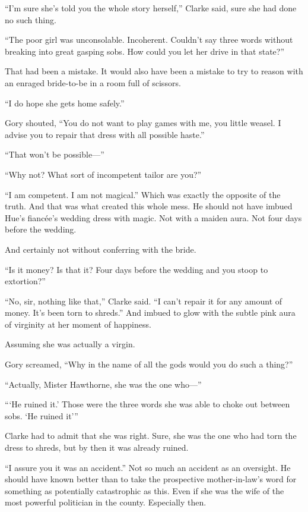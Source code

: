 ``I'm sure she's told you the whole story herself,'' Clarke said, sure she
had done no such thing.

``The poor girl was unconsolable. Incoherent. Couldn't say three words
without breaking into great gasping sobs. How could you let her drive in
that state?''

That had been a mistake. It would also have been a mistake to try to
reason with an enraged bride-to-be in a room full of scissors.

``I do hope she gets home safely.''

Gory shouted, ``You do not want to play games with me, you little weasel.
I advise you to repair that dress with all possible haste.''

``That won't be possible---''

``Why not? What sort of incompetent tailor are you?''

``I am competent. I am not magical.'' Which was exactly the opposite of
the truth. And that was what created this whole mess. He should not have
imbued Hue's fiancée's wedding dress with magic. Not with a maiden aura.
Not four days before the wedding.

And certainly not without conferring with the bride.

``Is it money? Is that it? Four days before the wedding and you stoop to
extortion?''

``No, sir, nothing like that,'' Clarke said. ``I can't repair it for any
amount of money. It's been torn to shreds.'' And imbued to glow with the
subtle pink aura of virginity at her moment of happiness.

Assuming she was actually a virgin.

Gory screamed, ``Why in the name of all the gods would you do such a
thing?''

``Actually, Mister Hawthorne, she was the one who---''

``\thinspace `He ruined it.' Those were the three words she was able to choke out
between sobs. `He ruined it'\thinspace ''

Clarke had to admit that she was right. Sure, she was the one who had
torn the dress to shreds, but by then it was already ruined.

``I assure you it was an accident.'' Not so much an accident as an
oversight. He should have known better than to take the prospective
mother-in-law's word for something as potentially catastrophic as this.
Even if she was the wife of the most powerful politician in the county.
Especially then.

